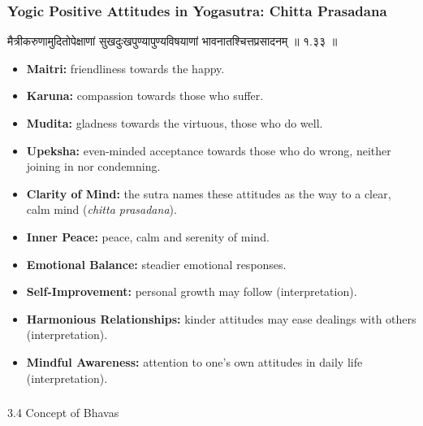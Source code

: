 \begin{frame}[fragile]\frametitle{Yogic Positive Attitudes in Yogasutra: Chitta Prasadana}

मैत्रीकरुणामुदितोपेक्षाणां सुखदुःखपुण्यापुण्यविषयाणां भावनातश्चित्तप्रसादनम् ॥ १.३३ ॥

      \begin{itemize}
        \item \textbf{Maitri:} friendliness towards the happy.
        \item \textbf{Karuna:} compassion towards those who suffer.
        \item \textbf{Mudita:} gladness towards the virtuous, those who do well.
        \item \textbf{Upeksha:} even-minded acceptance towards those who do wrong, neither joining in nor condemning.
        \item \textbf{Clarity of Mind:} the sutra names these attitudes as the way to a clear, calm mind (\textit{chitta prasadana}).
        \item \textbf{Inner Peace:} peace, calm and serenity of mind.
        \item \textbf{Emotional Balance:} steadier emotional responses.
        \item \textbf{Self-Improvement:} personal growth may follow (interpretation).
        \item \textbf{Harmonious Relationships:} kinder attitudes may ease dealings with others (interpretation).
        \item \textbf{Mindful Awareness:} attention to one's own attitudes in daily life (interpretation).
      \end{itemize}

\end{frame}

\begin{frame}[fragile]\frametitle{}
\begin{center}
{\Large 3.4 Concept of Bhavas}
\end{center}
\end{frame}



